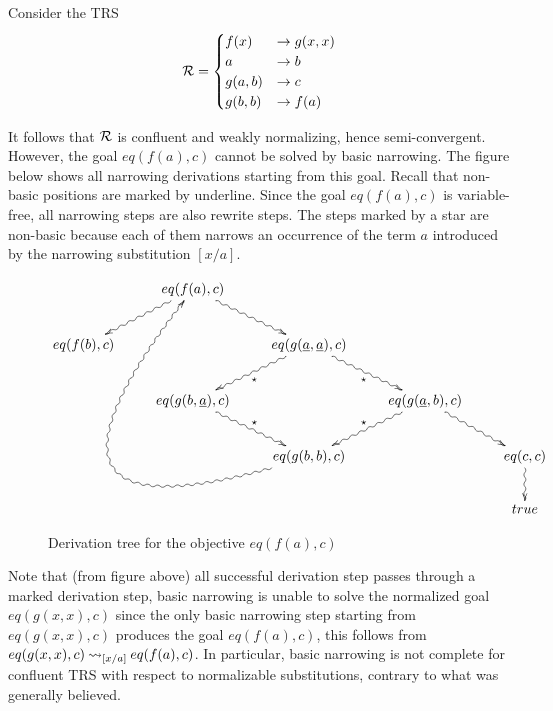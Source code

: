 Consider the TRS
\begin{displaymath}
    \mathcal{R} =
	\begin{cases}
		f(x) & \rightarrow g(x,x)                               \\
        a & \rightarrow b \\
        g(a,b) & \rightarrow c \\
        g(b,b) & \rightarrow f(a)
	\end{cases}
\end{displaymath}

It follows that $\mathcal{R}$ is confluent and weakly normalizing, hence semi-convergent. However, the goal $eq(f(a),c)$ cannot be solved by basic narrowing. The figure below shows all narrowing derivations starting from this goal. Recall that non-basic positions are marked by underline. Since the goal $eq(f(a),c)$ is variable-free, all narrowing steps are also rewrite steps. The steps marked by a star are non-basic because each of them narrows an occurrence of the term $a$ introduced by the narrowing substitution $[x / a]$.
\begin{figure}[!ht]
    \begin{displaymath}
        \xymatrix{
            & eq(f(a),c)\ar@{~>}[dr] \ar@{~>}[dl] &  &  &  \\
            eq(f(b),c) &  & eq(g(\underline{a},\underline{a}), c) \ar@{~>}[dl]^{\star} \ar@{~>}[dr]_{\star} &  & \\
            & eq(g(b,\underline{a}),c) \ar@{~>}[dr]^{\star} & & eq(g(\underline{a},b),c) \ar@{~>}[dl]_{\star} \ar@{~>}[dr] &\\
            & & eq(g(b,b),c) \ar@{~>}@/^10pc/[lluuur] & & eq(c,c) \ar@{~>}[d]\\
            & &  & & true
        }
    \end{displaymath}
    \caption{Derivation tree for the objective $eq(f(a),c)$}
    \label{figure:counterexample}
\end{figure}

Note that (from figure above) all successful derivation step passes through a marked derivation step, basic narrowing is unable to solve the normalized goal $eq(g(x,x),c)$ since the only basic narrowing step starting from $eq(g(x,x),c)$ produces the goal $eq(f(a),c)$, this follows from  $eq(g(x,x),c) \mathbin{\rightsquigarrow}_{[x/a]} eq(f(a),c)$. In particular, basic narrowing is not complete for confluent TRS with respect to normalizable substitutions, contrary to what was generally believed.
